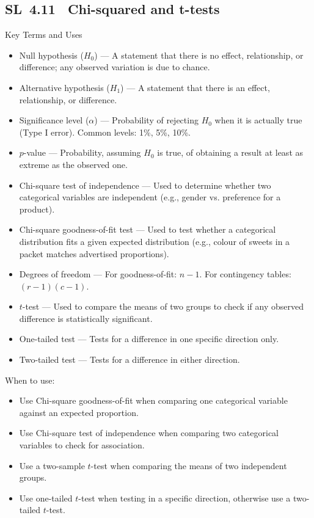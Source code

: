 \documentclass[11pt]{article}
\def\textbf#1{#1}%
\newcommand{\tocsubsection}[1]{\subsection{#1}}
\begin{document}
\tocsubsection{SL 4.11 \; Chi-squared and t-tests}




\textbf{Key Terms and Uses}
\begin{itemize}
    \item \textbf{Null hypothesis ($H_0$)} — A statement that there is no effect, relationship, or difference; any observed variation is due to chance.
    \item \textbf{Alternative hypothesis ($H_1$)} — A statement that there is an effect, relationship, or difference.
    \item \textbf{Significance level ($\alpha$)} — Probability of rejecting $H_0$ when it is actually true (Type I error). Common levels: 1\%, 5\%, 10\%.
    \item \textbf{$p$-value} — Probability, assuming $H_0$ is true, of obtaining a result at least as extreme as the observed one.
    \item \textbf{Chi-square test of independence} — Used to determine whether two categorical variables are independent (e.g., gender vs. preference for a product).
    \item \textbf{Chi-square goodness-of-fit test} — Used to test whether a categorical distribution fits a given expected distribution (e.g., colour of sweets in a packet matches advertised proportions).
    \item \textbf{Degrees of freedom} — For goodness-of-fit: $n-1$. For contingency tables: $(r-1)(c-1)$.
    \item \textbf{$t$-test} — Used to compare the means of two groups to check if any observed difference is statistically significant.
    \item \textbf{One-tailed test} — Tests for a difference in one specific direction only.
    \item \textbf{Two-tailed test} — Tests for a difference in either direction.
\end{itemize}

\textbf{When to use:}
\begin{itemize}
    \item Use \textbf{Chi-square goodness-of-fit} when comparing one categorical variable against an expected proportion.
    \item Use \textbf{Chi-square test of independence} when comparing two categorical variables to check for association.
    \item Use a \textbf{two-sample $t$-test} when comparing the means of two independent groups.
    \item Use \textbf{one-tailed $t$-test} when testing in a specific direction, otherwise use a \textbf{two-tailed $t$-test}.
\end{itemize}
\end{document}
